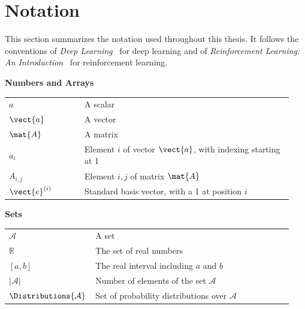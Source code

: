 \chapter*{Notation}
\label{chap:notation}

\newenvironment{notationgroup}[1]{%
  \par\medskip\Needspace{6\baselineskip}\renewcommand{\arraystretch}{1.3}
  \begin{center}\textbf{#1}\end{center}
  \begin{longtable}{@{}>{\centering\arraybackslash}p{0.25\linewidth}p{0.69\linewidth}@{}}
}{%
  \end{longtable}
}

This section summarizes the notation used throughout this thesis.
It follows the conventions of \emph{Deep Learning}~\parencite{goodfellow2016deep} for deep learning and of \emph{Reinforcement Learning: An Introduction}~\parencite{sutton2018reinforcement} for reinforcement learning.

\begin{notationgroup}{Numbers and Arrays}
$a$ & A scalar \\
$\vect{a}$ & A vector \\
$\mat{A}$ & A matrix \\
$a_i$ & Element $i$ of vector $\vect{a}$, with indexing starting at 1 \\
$A_{i,j}$ & Element $i, j$ of matrix $\mat{A}$ \\
$\vect{e}^{(i)}$ & Standard basis vector, with a 1 at position $i$ \\
\end{notationgroup}

\begin{notationgroup}{Sets}
$\mathcal{A}$ & A set \\
$\mathbb{R}$ & The set of real numbers \\
$[a, b]$ & The real interval including $a$ and $b$ \\
$|\mathcal{A}|$ & Number of elements of the set $\mathcal{A}$ \\
$\Distributions{\mathcal{A}}$ & Set of probability distributions over $\mathcal{A}$ \\
\end{notationgroup}

